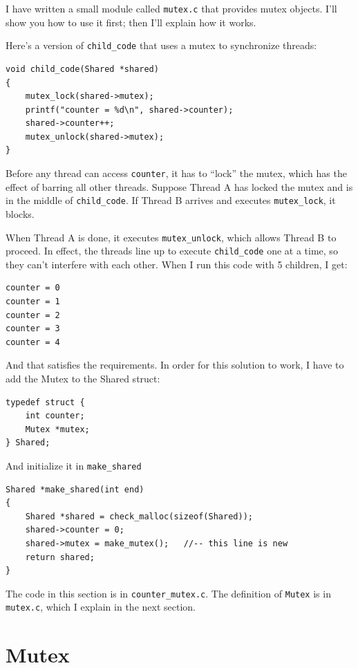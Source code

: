 \documentclass[12pt]{book}
\begin{document}
{I have written a small module called {\tt mutex.c} that provides
mutex objects.  I'll show you how to use it first; then I'll explain
how it works.

Here's a version of \verb"child_code" that uses a mutex to synchronize
threads:

\begin{verbatim}
void child_code(Shared *shared)
{
    mutex_lock(shared->mutex);
    printf("counter = %d\n", shared->counter);
    shared->counter++;
    mutex_unlock(shared->mutex);
}
\end{verbatim}

Before any thread can access {\tt counter}, it has to ``lock''
the mutex, which has the effect of barring all other threads.
Suppose Thread A has locked the mutex and is in the
middle of \verb"child_code".  If Thread B arrives and
executes \verb"mutex_lock", it blocks.

When Thread A is done, it executes \verb"mutex_unlock",
which allows Thread B to proceed.  In effect, the threads
line up to execute \verb"child_code" one at a time, so they
can't interfere with each other.  When I run this code with
5 children, I get:

\begin{verbatim}
counter = 0
counter = 1
counter = 2
counter = 3
counter = 4
\end{verbatim}

And that satisfies the requirements.  In order for this solution to
work, I have to add the Mutex to the Shared struct:

\begin{verbatim}
typedef struct {
    int counter;
    Mutex *mutex;
} Shared;
\end{verbatim}

And initialize it in \verb"make_shared"

\begin{verbatim}
Shared *make_shared(int end)
{
    Shared *shared = check_malloc(sizeof(Shared));
    shared->counter = 0;
    shared->mutex = make_mutex();   //-- this line is new
    return shared;
}
\end{verbatim}

The code in this section is in \verb"counter_mutex.c".
The definition of {\tt Mutex} is in {\tt mutex.c}, which I
explain in the next section.



\section{Mutex}

}
\end{document}
